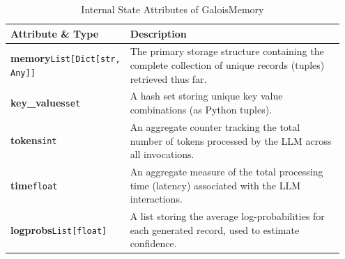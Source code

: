 \begin{table}[H]
    \centering
    \renewcommand{\arraystretch}{1.2}
    \begin{tabular}{p{0.25\linewidth} p{0.70\linewidth}}
        \toprule
        \textbf{Attribute \& Type} & \textbf{Description} \\
        \midrule
        \textbf{memory}\newline \small{\texttt{List[Dict[str, Any]]}} & 
        The primary storage structure containing the complete collection of unique records (tuples) retrieved thus far. \\
        \addlinespace
        \textbf{key\_values}\newline \small{\texttt{set}} & 
        A hash set storing unique key value combinations (as Python tuples). \\
        \addlinespace
        \textbf{tokens}\newline \small{\texttt{int}} & 
        An aggregate counter tracking the total number of tokens processed by the LLM across all invocations. \\
        \addlinespace
        \textbf{time}\newline \small{\texttt{float}} & 
        An aggregate measure of the total processing time (latency) associated with the LLM interactions. \\
        \addlinespace
        \textbf{logprobs}\newline \small{\texttt{List[float]}} & 
        A list storing the average log-probabilities for each generated record, used to estimate confidence. \\
        \bottomrule
    \end{tabular}
    \caption{Internal State Attributes of GaloisMemory}
    \label{tab:memory_attributes}
\end{table}

